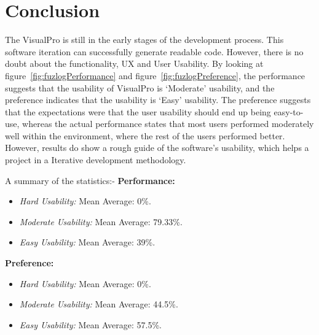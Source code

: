\documentclass[12pt]{report} %
\begin{document}
	\chapter{Conclusion}
		The VisualPro is still in the early stages of the development process. This software iteration can successfully generate readable code. However, there is no doubt about the functionality, UX and User Usability. By looking at figure~\ref{fig:fuzlogPerformance} and figure~\ref{fig:fuzlogPreference}, the performance suggests that the usability of VisualPro is `Moderate' usability, and the preference indicates that the usability is `Easy' usability. The preference suggests that the expectations were that the user usability should end up being easy-to-use, whereas the actual performance states that most users performed moderately well within the environment, where the rest of the users performed better. However, results do show a rough guide of the software's usability, which helps a project in a Iterative development methodology. 
		
		A summary of the statistics:- 
		\textbf{Performance:}
		\begin{itemize}
			\item \textit{Hard Usability:} Mean Average: 0\%.
			\item \textit{Moderate Usability:} Mean Average: 79.33\%.
			\item \textit{Easy Usability:} Mean Average: 39\%.
		\end{itemize}

		\textbf{Preference:}
		\begin{itemize}
			\item \textit{Hard Usability:} Mean Average: 0\%.
			\item \textit{Moderate Usability:} Mean Average: 44.5\%.
			\item \textit{Easy Usability:} Mean Average: 57.5\%.
		\end{itemize}
\end{document}
